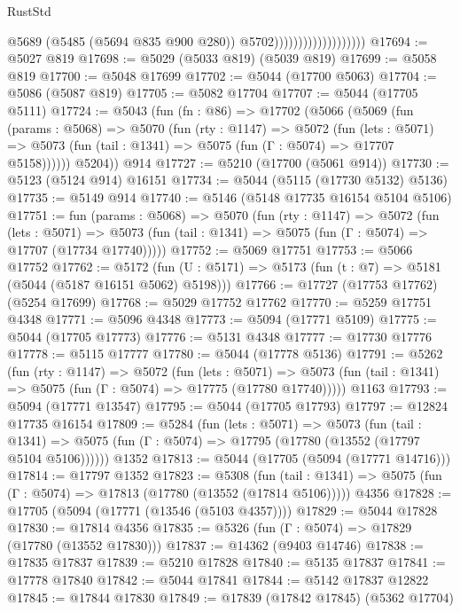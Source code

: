 \begin{lexlean}{RustStd}
\begin{coremodule}
                                          @5689
                                          (@5485 (@5694 @835 @900 @280))
                                          @5702)))))))))))))))))))
@17694 := @5027 @819
@17698 := @5029 (@5033 @819) (@5039 @819)
@17699 := @5058 @819
@17700 := @5048 @17699
@17702 := @5044 (@17700 @5063)
@17704 := @5086 (@5087 @819)
@17705 := @5082 @17704
@17707 := @5044 (@17705 @5111)
@17724 := @5043
    (fun (fn : @86) =>
    @17702
      (@5066
        (@5069
          (fun (params : @5068) =>
          @5070
            (fun (rty : @1147) =>
            @5072
              (fun (lets : @5071) =>
              @5073 (fun (tail : @1341) => @5075 (fun (Γ : @5074) => @17707 @5158))))))
        @5204))
    @914
@17727 := @5210 (@17700 (@5061 @914))
@17730 := @5123 (@5124 @914) @16151
@17734 := @5044 (@5115 (@17730 @5132) @5136)
@17735 := @5149 @914
@17740 := @5146 (@5148 @17735 @16154 @5104 @5106)
@17751 := fun (params : @5068) =>
  @5070
    (fun (rty : @1147) =>
    @5072
      (fun (lets : @5071) =>
      @5073 (fun (tail : @1341) => @5075 (fun (Γ : @5074) => @17707 (@17734 @17740)))))
@17752 := @5069 @17751
@17753 := @5066 @17752
@17762 := @5172
    (fun (U : @5171) => @5173 (fun (t : @7) => @5181 (@5044 (@5187 @16151 @5062) @5198)))
@17766 := @17727 (@17753 @17762) (@5254 @17699)
@17768 := @5029 @17752 @17762
@17770 := @5259 @17751 @4348
@17771 := @5096 @4348
@17773 := @5094 (@17771 @5109)
@17775 := @5044 (@17705 @17773)
@17776 := @5131 @4348
@17777 := @17730 @17776
@17778 := @5115 @17777
@17780 := @5044 (@17778 @5136)
@17791 := @5262
    (fun (rty : @1147) =>
    @5072
      (fun (lets : @5071) =>
      @5073 (fun (tail : @1341) => @5075 (fun (Γ : @5074) => @17775 (@17780 @17740)))))
    @1163
@17793 := @5094 (@17771 @13547)
@17795 := @5044 (@17705 @17793)
@17797 := @12824 @17735 @16154
@17809 := @5284
    (fun (lets : @5071) =>
    @5073
      (fun (tail : @1341) =>
      @5075 (fun (Γ : @5074) => @17795 (@17780 (@13552 (@17797 @5104 @5106))))))
    @1352
@17813 := @5044 (@17705 (@5094 (@17771 @14716)))
@17814 := @17797 @1352
@17823 := @5308
    (fun (tail : @1341) => @5075 (fun (Γ : @5074) => @17813 (@17780 (@13552 (@17814 @5106)))))
    @4356
@17828 := @17705 (@5094 (@17771 (@13546 (@5103 @4357))))
@17829 := @5044 @17828
@17830 := @17814 @4356
@17835 := @5326 (fun (Γ : @5074) => @17829 (@17780 (@13552 @17830)))
@17837 := @14362 (@9403 @14746)
@17838 := @17835 @17837
@17839 := @5210 @17828
@17840 := @5135 @17837
@17841 := @17778 @17840
@17842 := @5044 @17841
@17844 := @5142 @17837 @12822
@17845 := @17844 @17830
@17849 := @17839 (@17842 @17845) (@5362 @17704)

\end{coremodule}
\end{lexlean}
